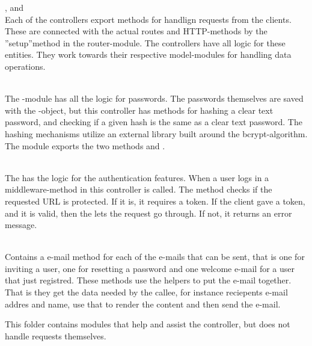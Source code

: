 \begin{description}
        \begin{description}
            \item{,  and } \\ 
                Each of the controllers export methods for handlign requests from the clients. These are connected with the actual routes and \gls{HTTP}-methods by the ''setup''method in the router-module. The controllers have all logic for these entities. They work towards their respective model-modules for handling data operations.
            \item{} \\ 
                The -module has all the logic for passwords. The passwords themselves are saved with the -object, but this controller has methods for hashing a clear text password, and checking if a given hash is the same as a clear text password. The hashing mechanisms utilize an external library built around the bcrypt-algorithm. \cite{bcrypt} The module exports the two methods  and .
            \item{} \\
                The  has the logic for the authentication features. When a user logs in a middleware-method in this controller is called. The method checks if the requested \gls{URL} is protected. If it is, it requires a token. If the client gave a token, and it is valid, then the  lets the request go through. If not, it returns an error message. 
            \item{} \\
                Contains a e-mail method for each of the e-mails that can be sent, that is one for inviting a user, one for resetting a password and one welcome e-mail for a user that just registred. These methods use the helpers to put the e-mail together. That is they get the data needed by the callee, for instance reciepents e-mail addres and name, use that to render the content and then send the e-mail. 
        \end{description}
    \item{\textbf{}} This folder contains modules that help and assist the controller, but does not handle requests themselves.
        \begin{description}
            \item{} \\ 

\end{description}
\end{description}
